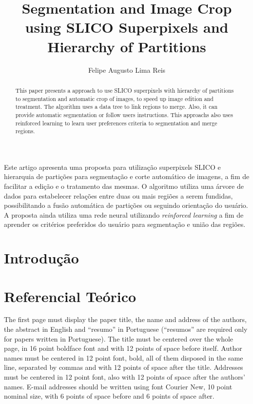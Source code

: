 \title{Segmentation and Image Crop using SLICO Superpixels and Hierarchy of Partitions}
\author{Felipe Augusto Lima Reis\inst{1}}
\begin{document}
 

\maketitle

\begin{abstract}
  This paper presents a approach to use SLICO superpixels with hierarchy of partitions to segmentation and automatic crop of images, to speed up image edition and treatment. The algorithm uses a data tree to link regions to merge. Also, it can provide automatic segmentation or follow users instructions. This approachs also uses reinforced learning to learn user preferences criteria to segmentation and merge regions.
\end{abstract}
     
\begin{resumo} 
  Este artigo apresenta uma proposta para utilização superpixels SLICO e hierarquia de partições para segmentação e corte automático de imagens, a fim de facilitar a edição e o tratamento das mesmas. O algoritmo utiliza uma árvore de dados para estabelecer relações entre duas ou mais regiões a serem fundidas, possibilitando a fusão automática de partições ou seguindo orientação do usuário. A proposta ainda utiliza uma rede neural utilizando \textit{reinforced learning} a fim de aprender os critérios preferidos do usuário para segmentação e união das regiões.
\end{resumo}


\section{Introdução} \label{sec:introducao}



\section{Referencial Teórico} \label{sec:ref_teorico}

The first page must display the paper title, the name and address of the
authors, the abstract in English and ``resumo'' in Portuguese (``resumos'' are
required only for papers written in Portuguese). The title must be centered
over the whole page, in 16 point boldface font and with 12 points of space
before itself. Author names must be centered in 12 point font, bold, all of
them disposed in the same line, separated by commas and with 12 points of
space after the title. Addresses must be centered in 12 point font, also with
12 points of space after the authors' names. E-mail addresses should be
written using font Courier New, 10 point nominal size, with 6 points of space
before and 6 points of space after.
\end{document}
